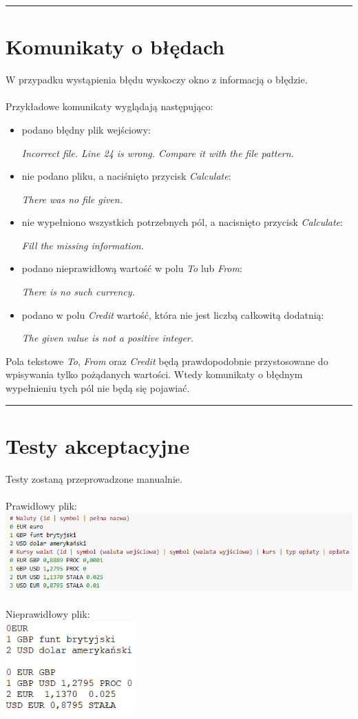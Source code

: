 \documentclass[a4paper,11pt]{article}
\newcommand{\linia}{\rule{\linewidth}{0.4mm}}
\begin{document}
\noindent\linia
\section{Komunikaty o błędach}
W przypadku wystąpienia błędu wyskoczy okno z informacją o błędzie. 
\\\\
Przykładowe komunikaty wyglądają następująco:
\begin{itemize}
\item podano błędny plik wejściowy:

\textit{Incorrect file. Line 24 is wrong. Compare it with the file pattern.}
\item nie podano pliku, a naciśnięto przycisk \textit{Calculate}:

\textit{There was no file given.}
\item nie wypełniono wszystkich potrzebnych pól, a nacisnięto przycisk \textit{Calculate}:

\textit{Fill the missing information.}
\item podano nieprawidłową wartość w polu \textit{To} lub \textit{From}:

\textit{There is no such currency.}
\item podano w polu \textit{Credit} wartość, która nie jest liczbą całkowitą dodatnią:

\textit{The given value is not a positive integer.}
\end{itemize}
Pola tekstowe \textit{To}, \textit{From} oraz \textit{Credit} będą prawdopodobnie przystosowane do wpisywania tylko pożądanych wartości. Wtedy komunikaty o błędnym wypełnieniu tych pól nie będą się pojawiać.

\noindent\linia
\section{Testy akceptacyjne}
Testy zostaną przeprowadzone manualnie.
\\\\
Prawidłowy plik:
\\
\includegraphics[width= 16cm]{FileFormat}
\\\\
Nieprawidłowy plik:
\\
\includegraphics[width= 5cm]{FaultyFileFormat}
\end{document}
